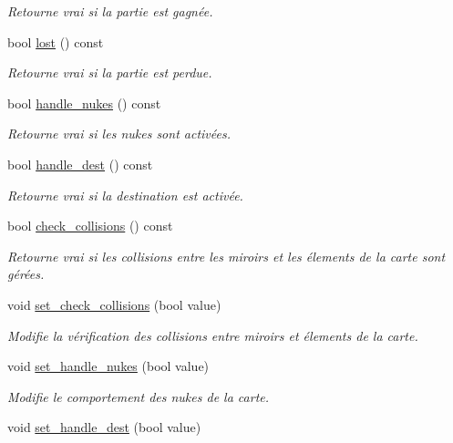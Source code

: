 \begin{DoxyCompactItemize}
\begin{DoxyCompactList}\small\item\em Retourne vrai si la partie est gagnée. \end{DoxyCompactList}\item 
bool \hyperlink{classLevel_ae6ba86e3567237e12f02f0cd86fc9eeb}{lost} () const 
\begin{DoxyCompactList}\small\item\em Retourne vrai si la partie est perdue. \end{DoxyCompactList}\item 
bool \hyperlink{classLevel_a0271a3a3e893573fa8f1095288def522}{handle\+\_\+nukes} () const 
\begin{DoxyCompactList}\small\item\em Retourne vrai si les nukes sont activées. \end{DoxyCompactList}\item 
bool \hyperlink{classLevel_afcf1375baa8203db70938a45edf701dd}{handle\+\_\+dest} () const 
\begin{DoxyCompactList}\small\item\em Retourne vrai si la destination est activée. \end{DoxyCompactList}\item 
bool \hyperlink{classLevel_a508860af696c5ebd84ec770e3c5d8eac}{check\+\_\+collisions} () const 
\begin{DoxyCompactList}\small\item\em Retourne vrai si les collisions entre les miroirs et les élements de la carte sont gérées. \end{DoxyCompactList}\item 
void \hyperlink{classLevel_a60d687f486e7c2517527b039feeafaae}{set\+\_\+check\+\_\+collisions} (bool value)
\begin{DoxyCompactList}\small\item\em Modifie la vérification des collisions entre miroirs et élements de la carte. \end{DoxyCompactList}\item 
void \hyperlink{classLevel_a27b98ccf50326ca83802de21ab4ea988}{set\+\_\+handle\+\_\+nukes} (bool value)
\begin{DoxyCompactList}\small\item\em Modifie le comportement des nukes de la carte. \end{DoxyCompactList}\item 
void \hyperlink{classLevel_a8334748aff161979d9184fa9dcd93062}{set\+\_\+handle\+\_\+dest} (bool value)

\end{DoxyCompactItemize}
